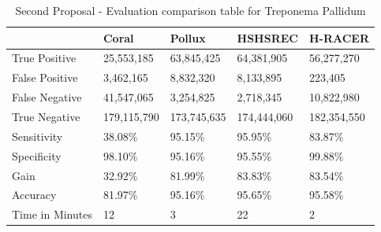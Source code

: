 \documentclass[12pt]{llncs}
\newcommand{\TBstrut}{{\rule{0pt}{7ex}}{\rule[2ex]{0pt}{0pt}}} %
\begin{document}
\begin{longtable}{|m{33mm}|m{20mm}|m{20mm}|m{20mm}|m{20mm}|}
	    \caption{\label{tab:eval-2}Second Proposal - Evaluation comparison table for Treponema Pallidum}\\
        \hline
           & Coral & Pollux & HSHSREC & H-RACER\cellcolor{DarkGray} \TBstrut\\ %
        \hline
           True Positive & 25,553,185 & 63,845,425 & 64,381,905 & 56,277,270\cellcolor{LightGray} \TBstrut\\ %
        \hline
           False Positive & 3,462,165 & 8,832,320 & 8,133,895 & 223,405\cellcolor{LightGray} \TBstrut\\ %
        \hline
           False Negative & 41,547,065 & 3,254,825 & 2,718,345 & 10,822,980\cellcolor{LightGray} \TBstrut\\ %
        \hline
           True Negative & 179,115,790 & 173,745,635 & 174,444,060 & 182,354,550\cellcolor{LightGray} \TBstrut\\ %
        \hline
           Sensitivity & 38.08\% & 95.15\% & 95.95\% & 83.87\%\cellcolor{LightGray} \TBstrut\\ %
        \hline
           Specificity & 98.10\% &  95.16\% & 95.55\% & 99.88\%\cellcolor{LightGray} \TBstrut\\ %
        \hline
           Gain & 32.92\% & 81.99\% & 83.83\% & 83.54\%\cellcolor{LightGray} \TBstrut\\ %
        \hline
           Accuracy & 81.97\% & 95.16\% & 95.65\% & 95.58\%\cellcolor{LightGray} \TBstrut\\ %
        \hline
           Time in Minutes& 12 & 3 & 22 & 2\cellcolor{LightGray} \TBstrut\\ %
        \hline
\end{longtable}
\newpage
\end{document}

